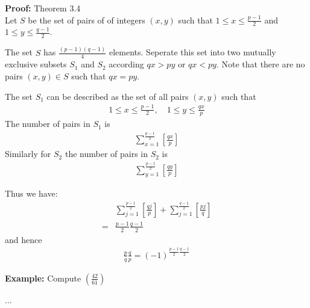 \documentclass[a4paper]{article}
\begin{document}
\textbf{Proof:} Theorem 3.4\\
Let $S$ be the set of pairs of of integers $(x,y)$ such that $1\leq x\leq\frac{p-1}{2}$ and $1\leq y\leq\frac{q-1}{2}$.

The set $S$ has $\frac{(p-1)(q-1)}{4}$ elements. Seperate this set into two mutually exclusive subsets $S_1$ and $S_2$ according $qx>py$ or $qx<py$. Note that there are no pairs $(x,y)\in S$ such that $qx=py$.

The set $S_1$ can be described as the set of all pairs $(x,y)$ such that
\begin{align}
    1\leq x\leq\frac{p-1}{2},\quad 1\leq y\leq\frac{qx}{p}
\end{align}
The number of pairs in $S_1$ is
\begin{align}
    \sum^\frac{p-1}{2}_{x=1}[\frac{qx}{p}]
\end{align}
Similarly for $S_2$ the number of pairs in $S_2$ is
\begin{align}
    \sum^\frac{p-1}{2}_{y=1}[\frac{qy}{p}]
\end{align}

Thus we have:
\begin{align}
     &\sum^{\frac{p-1}{2}}_{j=1}[\frac{qj}{p}]+\sum^{\frac{q-1}{2}}_{j=1}[\frac{pj}{q}]\\
    =&\frac{p-1}{2}\frac{q-1}{2}
\end{align}
and hence
\begin{align}
    \frac{p}{q}\frac{q}{p}=(-1)^{\frac{p-1}{2}\frac{q-1}{2}}
\end{align}

\textbf{Example:} Compute $(\frac{42}{61})$

...
\end{document}
